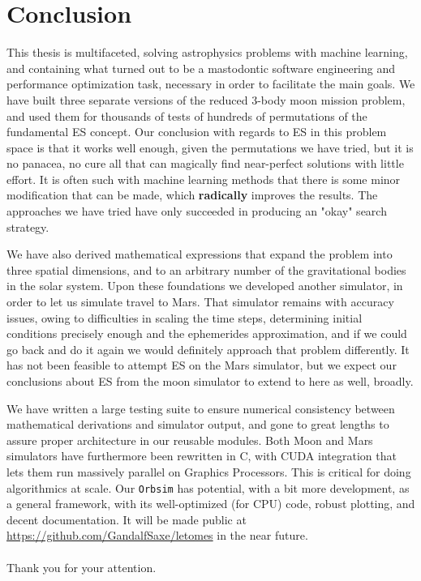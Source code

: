 
\chapter{Conclusion}
This thesis is multifaceted, solving astrophysics problems with machine learning, and containing what turned out to be a mastodontic software engineering and performance optimization task, necessary in order to facilitate the main goals. We have built three separate versions of the reduced 3-body moon mission problem, and used them for thousands of tests of hundreds of permutations of the fundamental ES concept. Our conclusion with regards to ES in this problem space is that it works well enough, given the permutations we have tried, but it is no panacea, no cure all that can magically find near-perfect solutions with little effort. It is often such with machine learning methods that there is some minor modification that can be made, which \textbf{radically} improves the results. The approaches we have tried have only succeeded in producing an "okay" search strategy. 

We have also derived mathematical expressions that expand the problem into three spatial dimensions, and to an arbitrary number of the gravitational bodies in the solar system. Upon these foundations we developed another simulator, in order to let us simulate travel to Mars. That simulator remains with accuracy issues, owing to difficulties in scaling the time steps, determining initial conditions precisely enough and the ephemerides approximation, and if we could go back and do it again we would definitely approach that problem differently. It has not been feasible to attempt ES on the Mars simulator, but we expect our conclusions about ES from the moon simulator to extend to here as well, broadly.

We have written a large testing suite to ensure numerical consistency between mathematical derivations and simulator output, and gone to great lengths to assure proper architecture in our reusable modules. Both Moon and Mars simulators have furthermore been rewritten in C, with CUDA integration that lets them run massively parallel on Graphics Processors. This is critical for doing algorithmics at scale. Our \texttt{Orbsim} has potential, with a bit more development, as a general framework, with its well-optimized (for CPU) code, robust plotting, and decent documentation. It will be made public at \url{https://github.com/GandalfSaxe/letomes} in the near future. \\
\\[1cm]
{\Large Thank you for your attention.}